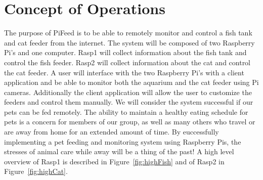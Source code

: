 




\usepackage[compact]{titlesec}





\section{Concept of Operations}
The purpose of PiFeed is to be able to remotely monitor and control a fish tank
and cat feeder from the internet. The system will be composed of two
Raspberry Pi's and one computer. Rasp1 will collect information about the fish
tank and control the fish feeder. Rasp2 will collect information about the cat
and control the cat feeder. A user will interface with the two Raspberry Pi's
with a client application and be able to monitor both the aquarium and the cat
feeder using Pi cameras. Additionally the client application will allow the user
to customize the feeders and control them manually. We will consider the system
successful if our pets can be fed remotely. The ability to maintain a healthy
eating schedule for pets is a concern for members of our group, as well as many
others who travel or are away from home for an extended amount of time. By
euccessfully implementing a pet feeding and monitoring system using Raspberry
Pis, the stresses of animal care while away will be a thing of the past! A
high level overview of Rasp1 is described in Figure~\ref{fig:highFish} and of
Rasp2 in Figure~\ref{fig:highCat}.


